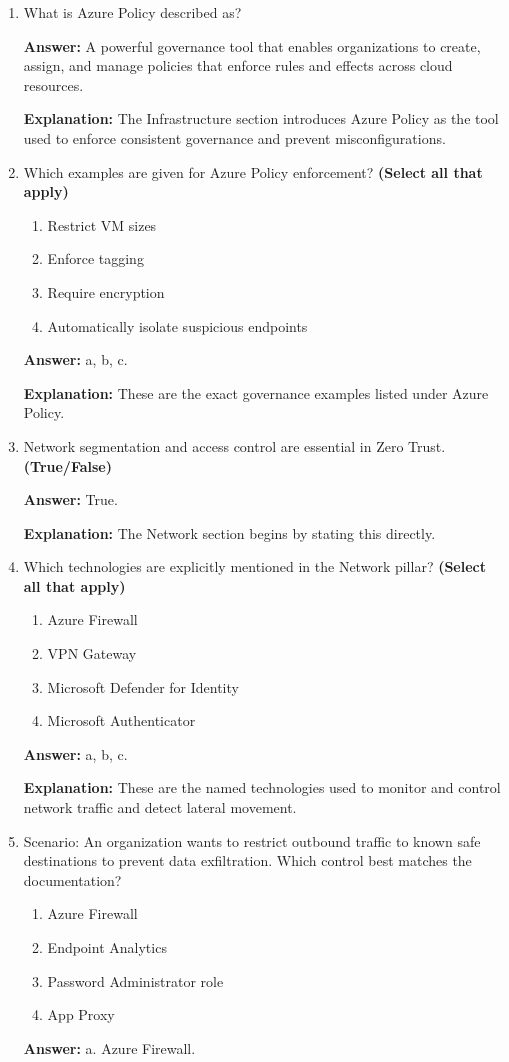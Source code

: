 \documentclass[10pt]{article}
\begin{document}
\begin{enumerate}[leftmargin=*]
\textbf{Explanation:} ISO 27001 and NIST.

\item What is Azure Policy described as?

\textbf{Answer:} A powerful governance tool that enables organizations to create, assign, and manage policies that enforce rules and effects across cloud resources.

\textbf{Explanation:} The Infrastructure section introduces Azure Policy as the tool used to enforce consistent governance and prevent misconfigurations.

\item Which examples are given for Azure Policy enforcement? \textbf{(Select all that apply)}
\begin{enumerate}[label=\alph*., leftmargin=1.5em]
\item Restrict VM sizes
\item Enforce tagging
\item Require encryption
\item Automatically isolate suspicious endpoints
\end{enumerate}
\textbf{Answer:} a, b, c.

\textbf{Explanation:} These are the exact governance examples listed under Azure Policy.

\item Network segmentation and access control are essential in Zero Trust. \textbf{(True/False)}

\textbf{Answer:} True.

\textbf{Explanation:} The Network section begins by stating this directly.

\item Which technologies are explicitly mentioned in the Network pillar? \textbf{(Select all that apply)}
\begin{enumerate}[label=\alph*., leftmargin=1.5em]
\item Azure Firewall
\item VPN Gateway
\item Microsoft Defender for Identity
\item Microsoft Authenticator
\end{enumerate}
\textbf{Answer:} a, b, c.

\textbf{Explanation:} These are the named technologies used to monitor and control network traffic and detect lateral movement.

\item Scenario: An organization wants to restrict outbound traffic to known safe destinations to prevent data exfiltration. Which control best matches the documentation?
\begin{enumerate}[label=\alph*., leftmargin=1.5em]
\item Azure Firewall
\item Endpoint Analytics
\item Password Administrator role
\item App Proxy
\end{enumerate}
\textbf{Answer:} a. Azure Firewall.


\end{enumerate}
\end{document}
